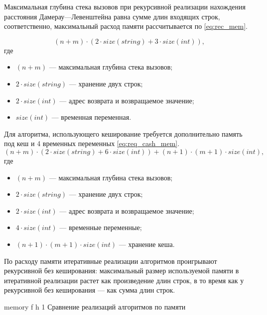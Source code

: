 Максимальная глубина стека вызовов при рекурсивной реализации нахождения расстояния Дамерау---Левенштейна равна сумме длин входящих строк, соответственно, максимальный расход памяти рассчитывается по \eqref{eq:rec_mem}.

\begin{equation}
	\label{eq:rec_mem}
	(n + m) \cdot (2 \cdot size(string) + 3 \cdot size(int)),
\end{equation}
где 
\begin{itemize}
	\item $ (n + m) $ --- максимальная глубина стека вызовов;
	\item $ 2 \cdot size(string) $ --- хранение двух строк;
	\item $ 2 \cdot size(int) $ --- адрес возврата и возвращаемое значение;
	\item $ size(int) $ --- временная переменная.
\end{itemize}

Для алгоритма, использующего кеширование требуется дополнительно память под кеш и 4 временных переменных \eqref{eq:req_cash_mem}.
\begin{equation}
	\label{eq:req_cash_mem}
	(n + m) \cdot (2 \cdot size(string) + 6 \cdot size(int)) + (n + 1) \cdot (m + 1) \cdot size(int),
\end{equation}
где 
\begin{itemize}
	\item $ (n + m) $ --- максимальная глубина стека вызовов;
	\item $ 2 \cdot size(string) $ --- хранение двух строк;
	\item $ 2 \cdot size(int) $ --- адрес возврата и возвращаемое значение;
	\item $ 4 \cdot size(int) $ --- временные переменные;
	\item $ (n + 1) \cdot (m + 1) \cdot size(int) $ --- хранение кеша.
\end{itemize}

По расходу памяти итеративные реализации алгоритмов проигрывают рекурсивной без кеширования: максимальный размер используемой памяти в итеративной реализации растет как произведение длин строк, в то время как у рекурсивной без кеширования --- как сумма длин строк.

{memory} %
{f} %
{h} %
{1\textwidth} %
{Сравнение реализаций алгоритмов по памяти} %

